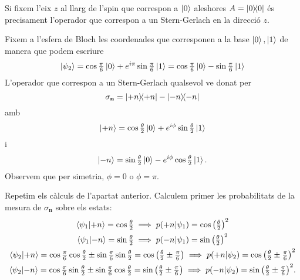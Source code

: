 \documentclass[12pt]{article}
\numberwithin{table}{section}
\numberwithin{figure}{section}
\numberwithin{equation}{section}
\renewcommand{\vec}[1]{\mathbf{#1}}
\newcommand{\proj}[1]{\ketbra{#1}{#1}}
\begin{document}
\section{}
Si fixem l'eix \( z \) al llarg de l'spin que correspon a \( \ket{0} \) aleshores \( A = \proj{0} \) és precisament l'operador que correspon a un Stern-Gerlach en la direcció \( z \). 

Fixem a l'esfera de Bloch les coordenades que corresponen a la base \( \ket{0}, \ket{1} \) de manera que podem escriure 
\begin{equation*}
 	\ket{\psi_2} = \cos{\tfrac{\pi}{6}} \ket{0} + e^{i\pi} \sin{\tfrac{\pi}{6}}\ket{1} = \cos{\tfrac{\pi}{6}} \ket{0} - \sin{\tfrac{\pi}{6}}\ket{1} 
\end{equation*}
 L'operador que correspon a un Stern-Gerlach qualsevol ve donat per 
\begin{equation*}
	\sigma_{\vec{n}} = \proj{+n} - \proj{-n}
\end{equation*}
amb
\begin{equation*}
	\ket{+n} = \cos{\tfrac{\theta}{2}} \ket{0} + e^{i\phi}\sin{\tfrac{\theta}{2}} \ket{1}
\end{equation*}
i
\begin{equation*}
	\ket{-n} = \sin{\tfrac{\theta}{2}} \ket{0} - e^{i\phi}\cos{\tfrac{\theta}{2}} \ket{1}.
\end{equation*}
Observem que per simetria, \( \phi = 0 \) o \( \phi = \pi \). 

Repetim els càlculs de l'apartat anterior. Calculem primer les probabilitats de la mesura de \( \sigma_\vec{n} \) sobre els estats:
\begin{gather*}
	\braket{\psi_1}{+n} = \cos{\tfrac{\theta}{2}} \implies p(+n \vert \psi_1) = \cos{\left(\tfrac{\theta}{2}\right)}^2 \\
	\braket{\psi_1}{-n} = \sin{\tfrac{\theta}{2}} \implies p(-n \vert \psi_1) = \sin{\left(\tfrac{\theta}{2}\right)}^2 \\
	\braket{\psi_2}{+n} = \cos{\tfrac{\pi}{6}} \cos{\tfrac{\theta}{2}} \pm \sin{\tfrac{\pi}{6}}\sin{\tfrac{\theta}{2}} = \cos{\left(\tfrac{\theta}{2} \pm \tfrac{\pi}{6}\right)} \implies p(+n \vert \psi_2) = \cos{\left(\tfrac{\theta}{2} \pm \tfrac{\pi}{6}\right)}^2 \\
	\braket{\psi_2}{-n} = \cos{\tfrac{\pi}{6}} \sin{\tfrac{\theta}{2}} \pm \sin{\tfrac{\pi}{6}}\cos{\tfrac{\theta}{2}} = \sin{\left(\tfrac{\theta}{2} \pm \tfrac{\pi}{6}\right)} \implies p(-n \vert \psi_2) = \sin{\left(\tfrac{\theta}{2} \pm \tfrac{\pi}{6}\right)}^2. 
\end{gather*}
\end{document}
